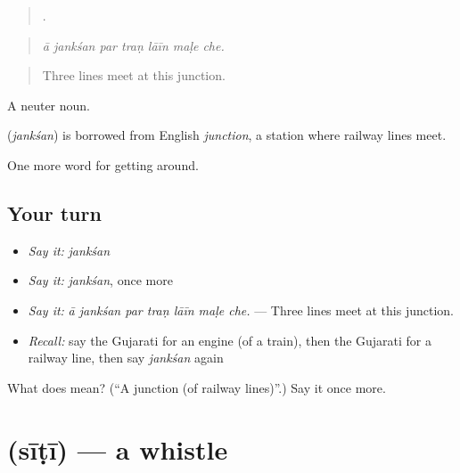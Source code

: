 \begin{quote}
      .
\end{quote}

\begin{quote}
\emph{ā jankśan par traṇ lāīn maḷe che.}
\end{quote}

\begin{quote}
Three lines meet at this junction.
\end{quote}

A neuter noun.

\begin{cousinweb}
\textbf{} (\emph{jankśan}) is borrowed from English \emph{junction}, a station where railway lines meet.
\end{cousinweb}

\begin{grammarlens}[title={What you've built}]
One more word for getting around.
\end{grammarlens}

\subsection*{Your turn}
\begin{itemize}
\raggedright
  \item \emph{Say it:} \emph{jankśan}
  \item \emph{Say it:} \emph{jankśan}, once more
  \item \emph{Say it:} \emph{ā jankśan par traṇ lāīn maḷe che.} — Three lines meet at this junction.
  \item \emph{Recall:} say the Gujarati for an engine (of a train), then the Gujarati for a railway line, then say \emph{jankśan} again
\end{itemize}

\begin{tcolorbox}[breakable,colback=teal!4,colframe=teal!35!black,title={Before you move on}]
What does  mean? (\textquotedblleft{}A junction (of railway lines)\textquotedblright{}.) Say it once more.
\end{tcolorbox}
\section[\texorpdfstring{\gu{સીટી} (sīṭī)}{સીટી (sīṭī)}]{ (sīṭī) — a whistle}

\label{lesson:GU-C393-siti}



